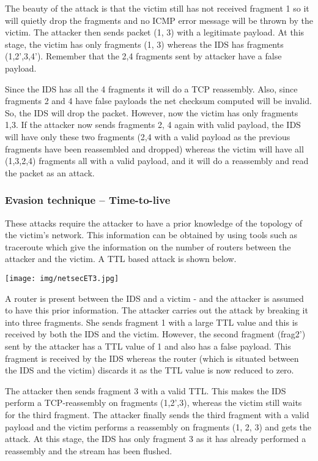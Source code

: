 \documentclass[a4paper, 10pt, titlepage]{article}
\begin{document}
\begin{itemize}
	The beauty of the attack is that the victim still has not received fragment 1 so it will quietly drop the fragments and no ICMP error message will be thrown by the victim. The attacker then sends packet (1, 3) with a legitimate payload. At this stage, the victim has only fragments (1, 3) whereas the IDS has fragments (1,2',3,4'). Remember that the 2,4 fragments sent by attacker have a false payload.
	
	Since the IDS has all the 4 fragments it will do a TCP reassembly. Also, since fragments 2 and 4 have false payloads the net checksum computed will be invalid. So, the IDS will drop the packet. However, now the victim has only fragments 1,3. If the attacker now sends fragments 2, 4 again with valid payload, the IDS will have only these two fragments (2,4 with a valid payload as the previous fragments have been reassembled and dropped) whereas the victim will have all (1,3,2,4) fragments all with a valid payload, and it will do a reassembly and read the packet as an attack.
\end{itemize}

\subsubsection*{Evasion technique – Time-to-live}
These attacks require the attacker to have a prior knowledge of the topology of the victim's network. This information can be obtained by using tools such as traceroute which give the information on the number of routers between the attacker and the victim. A TTL based attack is shown below.
\begin{center}
	\texttt{[image: img/netsecET3.jpg]}
\end{center}
A router is present between the IDS and a victim - and the attacker is assumed to have this prior information. The attacker carries out the attack by breaking it into three fragments. She sends fragment 1 with a large TTL value and this is received by both the IDS and the victim. However, the second fragment (frag2') sent by the attacker has a TTL value of 1 and also has a false payload. This fragment is received by the IDS whereas the router (which is situated between the IDS and the victim) discards it as the TTL value is now reduced to zero.

The attacker then sends fragment 3 with a valid TTL. This makes the IDS perform a TCP-reassembly on fragments (1,2',3), whereas the victim still waits for the third fragment. The attacker finally sends the third fragment with a valid payload and the victim performs a reassembly on fragments (1, 2, 3) and gets the attack. At this stage, the IDS has only fragment 3 as it has already performed a reassembly and the stream has been flushed.
\end{document}

